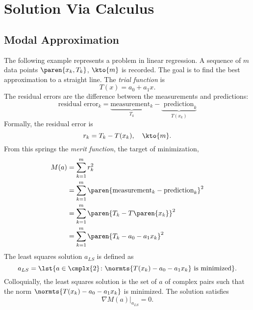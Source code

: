 \chapter{Solution Via Calculus}

\section{Modal Approximation}  %
The following example represents a problem in linear regression. A sequence of $m$ data points $\paren{x_{k}, T_{k}}$,  $\kto{m}$  is recorded. The goal is to find the best approximation to a straight line. The \emph{trial function} is
  \begin{equation*}   %
    T(x) = a_{0} + a_{1} x .
    \label{eq:lr trial}
  \end{equation*}
The residual errors are the difference between the measurements and predictions:\\
  \begin{equation*}   %
      \text{residual error}_{k} = \underbrace{\text{measurement}_{k}}_{T_{k}} - \underbrace{\text{ prediction}_{k}}_{T(x_{k})}
  \end{equation*}
Formally, the residual error is
  \begin{equation*}   %
    r_{k} = T_{k} - T(x_{k}), \quad \kto{m}.
  \end{equation*}
From this springs the \emph{merit function}, the target of minimization,
  \begin{equation}   %
  \begin{split}
    M(a) 
      &= \sum_{k=1}^{m} r_{k}^{2} \\
      &= \sum_{k=1}^{m} \paren{\text{measurement}_{k} - \text{prediction}_{k}}^{2} \\
      &= \sum_{k=1}^{m} \paren{T_{k} - T\paren{x_{k}}}^{2} \\
      &= \sum_{k=1}^{m} \paren{T_{k} - a_{0} - a_{1} x_{k}}^{2}
    \label{eqn:merit}
  \end{split}
  \end{equation}
The least squares solution $a_{LS}$ is defined as 
  \begin{equation*}   %
    a_{LS} = \lst{a \in \cmplx{2} \colon \normts{T(x_{k}) - a_{0} - a_{1} x_{k}} \text{ is minimized} }.
  \end{equation*}
Colloquially, the least squares solution is the set of $a$ of complex pairs such that the norm $\normts{T(x_{k}) - a_{0} - a_{1} x_{k}}$ is minimized.
The solution satisfies
  \begin{equation}   %
    \nabla M( a )|_{a_{LS}} = 0 .
    \label{eq:gradient lr}
  \end{equation}

